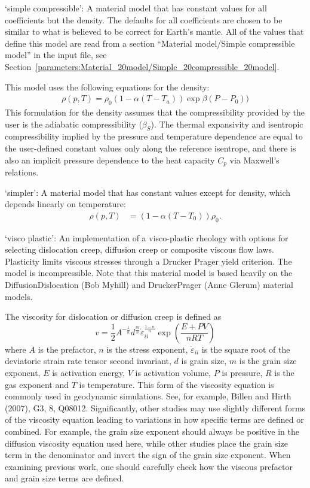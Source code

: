 \begin{itemize}
`simple compressible': A material model that has constant values for all coefficients but the density. The defaults for all coefficients are chosen to be similar to what is believed to be correct for Earth's mantle. All of the values that define this model are read from a section ``Material model/Simple compressible model'' in the input file, see Section~\ref{parameters:Material_20model/Simple_20compressible_20model}.

This model uses the following equations for the density: \begin{align}  \rho(p,T) = \rho_0              \left(1-\alpha (T-T_a)\right)               \exp{\beta (P-P_0))}\end{align}This formulation for the density assumes that the compressibility provided by the user is the adiabatic compressibility ($\beta_S$). The thermal expansivity and isentropic compressibility implied by the pressure and temperature dependence are equal to the user-defined constant values only along the reference isentrope, and there is also an implicit pressure dependence to the heat capacity $C_p$ via Maxwell's relations.

`simpler': A material model that has constant values except for density, which depends linearly on temperature: \begin{align}  \rho(p,T) &= \left(1-\alpha (T-T_0)\right)\rho_0.\end{align}


`visco plastic': An implementation of a visco-plastic rheology with options for selecting dislocation creep, diffusion creep or composite viscous flow laws.  Plasticity limits viscous stresses through a Drucker Prager yield criterion. The model is incompressible. Note that this material model is based heavily on the DiffusionDislocation (Bob Myhill) and DruckerPrager (Anne Glerum) material models. 

 The viscosity for dislocation or diffusion creep is defined as \[v = \frac 12 A^{-\frac{1}{n}} d^{\frac{m}{n}} \dot{\varepsilon}_{ii}^{\frac{1-n}{n}} \exp\left(\frac{E + PV}{nRT}\right)\] where $A$ is the prefactor, $n$ is the stress exponent, $\dot{\varepsilon}_{ii}$ is the square root of the deviatoric strain rate tensor second invariant, $d$ is grain size, $m$ is the grain size exponent, $E$ is activation energy, $V$ is activation volume, $P$ is pressure, $R$ is the gas exponent and $T$ is temperature. This form of the viscosity equation is commonly used in geodynamic simulations. See, for example, Billen and Hirth (2007), G3, 8, Q08012. Significantly, other studies may use slightly different forms of the viscosity equation leading to variations in how specific terms are defined or combined. For example, the grain size exponent should always be positive in the diffusion viscosity equation used here, while other studies place the grain size term in the denominator and invert the sign of the grain size exponent. When examining previous work, one should carefully check how the viscous prefactor and grain size terms are defined. 


\end{itemize}

